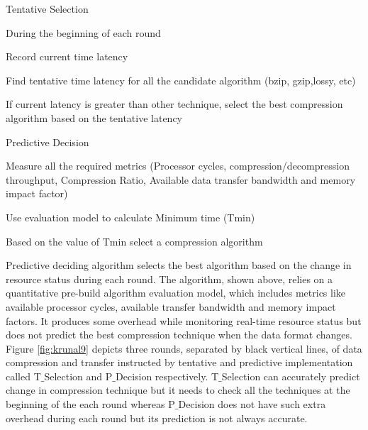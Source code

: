 \documentclass[runningheads,a4paper]{llncs}
\begin{document}
{	\begin{algorithm}
		\caption{Tentative Selection}\label{tentative}
		During the beginning of each round
		\begin{algorithmic}[1]
				
			\item Record current time latency
			
			\item Find tentative time latency for all the candidate algorithm (bzip, gzip,lossy, etc)
			\item If current latency is greater than other technique, select the best compression algorithm based on the tentative latency
			
		\end{algorithmic}
	\end{algorithm}
	
	\begin{algorithm}
		\caption{Predictive Decision}\label{predictive}
		\begin{algorithmic}[1]
			
			\item Measure all the required metrics (Processor cycles, compression/decompression throughput, Compression Ratio, Available data transfer bandwidth and memory impact factor)
			
			\item  Use evaluation model to calculate Minimum time (Tmin)
			\item  Based on the value of Tmin select a compression algorithm
			
		\end{algorithmic}
	\end{algorithm}



Predictive deciding algorithm selects the best algorithm based on the change in resource status during each round. The algorithm, shown above, relies on a quantitative pre-build algorithm evaluation model, which includes metrics like available processor cycles, available transfer bandwidth and memory impact factors. It produces some overhead while monitoring real-time resource status but does not predict the best compression technique when the data format changes. Figure \ref{fig:krunal9} depicts three rounds, separated by black vertical lines, of data compression and transfer instructed by tentative and predictive implementation called T$\_$Selection and P$\_$Decision respectively. T$\_$Selection can accurately predict change in compression technique but it needs to check all the techniques at the beginning of the each round whereas P$\_$Decision does not have such extra overhead during each round but its prediction is not always accurate. \\

}
\end{document}
